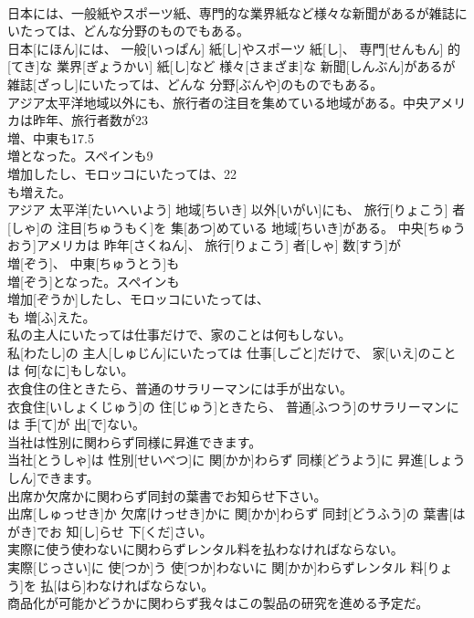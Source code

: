 \documentclass[8pt]{extreport}
\begin{document}
\begin{CJK}{UTF8}{min}
\\	日本には、一般紙やスポーツ紙、専門的な業界紙など様々な新聞があるが雑誌にいたっては、どんな分野のものでもある。	
\\	日本[にほん]には、 一般[いっぱん] 紙[し]やスポーツ 紙[し]、 専門[せんもん] 的[てき]な 業界[ぎょうかい] 紙[し]など 様々[さまざま]な 新聞[しんぶん]があるが 雑誌[ざっし]にいたっては、どんな 分野[ぶんや]のものでもある。
\\	アジア太平洋地域以外にも、旅行者の注目を集めている地域がある。中央アメリカは昨年、旅行者数が23
\\	増、中東も17.5
\\	増となった。スペインも9
\\	増加したし、モロッコにいたっては、22
\\	も増えた。	
\\	アジア 太平洋[たいへいよう] 地域[ちいき] 以外[いがい]にも、 旅行[りょこう] 者[しゃ]の 注目[ちゅうもく]を 集[あつ]めている 地域[ちいき]がある。 中央[ちゅうおう]アメリカは 昨年[さくねん]、 旅行[りょこう] 者[しゃ] 数[すう]が 
\\	増[ぞう]、 中東[ちゅうとう]も 
\\	増[ぞう]となった。スペインも 
\\	増加[ぞうか]したし、モロッコにいたっては、 
\\	も 増[ふ]えた。
\\	私の主人にいたっては仕事だけで、家のことは何もしない。	
\\	私[わたし]の 主人[しゅじん]にいたっては 仕事[しごと]だけで、 家[いえ]のことは 何[なに]もしない。
\\	衣食住の住ときたら、普通のサラリーマンには手が出ない。	
\\	衣食住[いしょくじゅう]の 住[じゅう]ときたら、 普通[ふつう]のサラリーマンには 手[て]が 出[で]ない。
\\	当社は性別に関わらず同様に昇進できます。	
\\	当社[とうしゃ]は 性別[せいべつ]に 関[かか]わらず 同様[どうよう]に 昇進[しょうしん]できます。
\\	出席か欠席かに関わらず同封の葉書でお知らせ下さい。	
\\	出席[しゅっせき]か 欠席[けっせき]かに 関[かか]わらず 同封[どうふう]の 葉書[はがき]でお 知[し]らせ 下[くだ]さい。
\\	実際に使う使わないに関わらずレンタル料を払わなければならない。	
\\	実際[じっさい]に 使[つか]う 使[つか]わないに 関[かか]わらずレンタル 料[りょう]を 払[はら]わなければならない。
\\	商品化が可能かどうかに関わらず我々はこの製品の研究を進める予定だ。	

\end{CJK}
\end{document}
